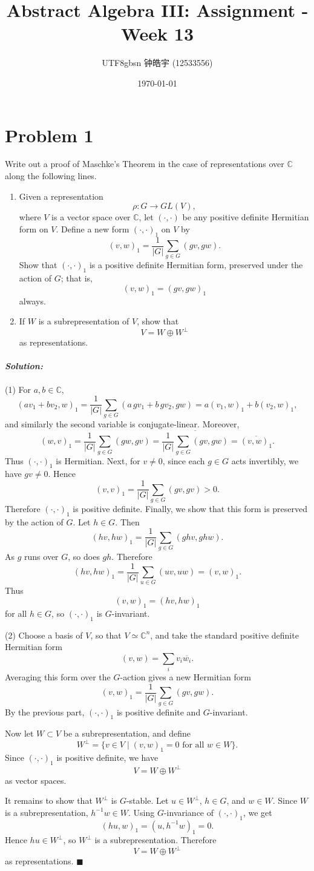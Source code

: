 \documentclass[12pt, a4paper]{article}
\title{Abstract Algebra III: Assignment - Week 13}
\author{
    \begin{CJK*}{UTF8}{gbsn}
    钟皓宇 (12533556)
    \end{CJK*}
}
\date{\today}
\theoremstyle{remark}
\newenvironment{solution}
  {\paragraph{\textit{Solution:}}\par\medskip}
  {\hfill$\blacksquare$\vspace{0.1cm}}
\begin{document}
\maketitle
\section*{Problem 1}

Write out a proof of Maschke's Theorem in the case of representations over
\(\mathbb{C}\) along the following lines.
\begin{enumerate}
    \item Given a representation
\[
\rho:G\to GL(V),
\]
where \(V\) is a vector space over \(\mathbb{C}\), let \((\cdot,\cdot)\) be any
positive definite Hermitian form on \(V\). Define a new form
\((\cdot,\cdot)_1\) on \(V\) by
\[
(v,w)_1=\frac{1}{|G|}\sum_{g\in G}(gv,gw).
\]
Show that \((\cdot,\cdot)_1\) is a positive definite Hermitian form, preserved
under the action of \(G\); that is,
\[
(v,w)_1=(gv,gw)_1
\]
always.
    \item If \(W\) is a subrepresentation of \(V\), show that
\[
V=W\oplus W^\perp
\]
as representations.
\end{enumerate}
\begin{solution}
(1) For \(a,b\in \mathbb C\),
\[
(av_1+bv_2,w)_1
=\frac{1}{|G|}\sum_{g\in G}(a\,gv_1+b\,gv_2,gw)
=a(v_1,w)_1+b(v_2,w)_1,
\]
and similarly the second variable is conjugate-linear. Moreover,
\[
(w,v)_1
=\frac{1}{|G|}\sum_{g\in G}(gw,gv)
=\overline{\frac{1}{|G|}\sum_{g\in G}(gv,gw)}
=\overline{(v,w)_1}.
\]
Thus \((\cdot,\cdot)_1\) is Hermitian.
Next, for \(v\neq 0\), since each \(g\in G\) acts invertibly, we have \(gv\neq 0\). Hence
\[
(v,v)_1=\frac{1}{|G|}\sum_{g\in G}(gv,gv)>0.
\]
Therefore \((\cdot,\cdot)_1\) is positive definite.
Finally, we show that this form is preserved by the action of \(G\). Let \(h\in G\). Then
\[
(hv,hw)_1
=\frac{1}{|G|}\sum_{g\in G}(ghv,ghw).
\]
As \(g\) runs over \(G\), so does \(gh\). Therefore
\[
(hv,hw)_1
=\frac{1}{|G|}\sum_{u\in G}(uv,uw)
=(v,w)_1.
\]
Thus
\[
(v,w)_1=(hv,hw)_1
\]
for all \(h\in G\), so \((\cdot,\cdot)_1\) is \(G\)-invariant.

(2) Choose a basis of \(V\), so that \(V\simeq \mathbb C^n\), and take the
standard positive definite Hermitian form
\[
(v,w)=\sum_i v_i\overline{w_i}.
\]
Averaging this form over the \(G\)-action gives a new Hermitian form
\[
(v,w)_1=\frac{1}{|G|}\sum_{g\in G}(gv,gw).
\]
By the previous part, \((\cdot,\cdot)_1\) is positive definite and
\(G\)-invariant.

Now let \(W\subset V\) be a subrepresentation, and define
\[
W^\perp=\{v\in V\mid (v,w)_1=0 \text{ for all } w\in W\}.
\]
Since \((\cdot,\cdot)_1\) is positive definite, we have
\[
V=W\oplus W^\perp
\]
as vector spaces.

It remains to show that \(W^\perp\) is \(G\)-stable. Let \(u\in W^\perp\),
\(h\in G\), and \(w\in W\). Since \(W\) is a subrepresentation,
\(h^{-1}w\in W\). Using \(G\)-invariance of \((\cdot,\cdot)_1\), we get
\[
(hu,w)_1=(u,h^{-1}w)_1=0.
\]
Hence \(hu\in W^\perp\), so \(W^\perp\) is a subrepresentation. Therefore
\[
V=W\oplus W^\perp
\]
as representations.
\end{solution}
\end{document}
